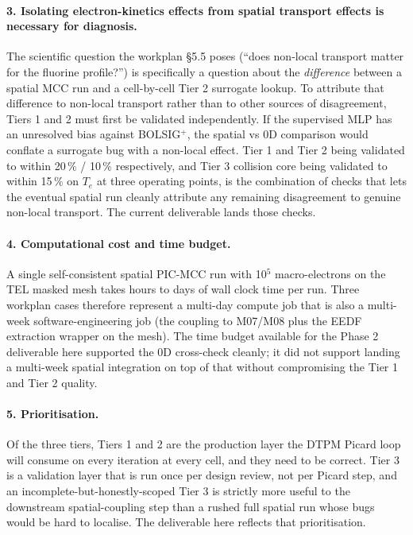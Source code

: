 \documentclass[11pt,a4paper]{article}
\begin{document}
\paragraph{3. Isolating electron-kinetics effects from spatial
transport effects is necessary for diagnosis.} The scientific
question the workplan §5.5 poses (``does non-local transport matter
for the fluorine profile?'') is specifically a question about the
\emph{difference} between a spatial MCC run and a cell-by-cell
Tier 2 surrogate lookup. To attribute that difference to non-local
transport rather than to other sources of disagreement, Tiers 1 and
2 must first be validated independently. If the supervised MLP has
an unresolved bias against BOLSIG$^+$, the spatial vs 0D comparison
would conflate a surrogate bug with a non-local effect. Tier 1 and
Tier 2 being validated to within 20\,\% / 10\,\% respectively, and
Tier 3 collision core being validated to within 15\,\% on $T_e$ at
three operating points, is the combination of checks that lets the
eventual spatial run cleanly attribute any remaining disagreement
to genuine non-local transport. The current deliverable lands those
checks.

\paragraph{4. Computational cost and time budget.} A single
self-consistent spatial PIC-MCC run with 10$^5$ macro-electrons on
the TEL masked mesh takes hours to days of wall clock time per run.
Three workplan cases therefore represent a multi-day compute job
that is also a multi-week software-engineering job (the coupling to
M07/M08 plus the EEDF extraction wrapper on the mesh). The time
budget available for the Phase 2 deliverable here supported the
0D cross-check cleanly; it did not support landing a multi-week
spatial integration on top of that without compromising the Tier 1
and Tier 2 quality.

\paragraph{5. Prioritisation.} Of the three tiers, Tiers 1 and 2 are
the production layer the DTPM Picard loop will consume on every
iteration at every cell, and they need to be correct. Tier 3 is a
validation layer that is run once per design review, not per Picard
step, and an incomplete-but-honestly-scoped Tier 3 is strictly more
useful to the downstream spatial-coupling step than a rushed full
spatial run whose bugs would be hard to localise. The deliverable
here reflects that prioritisation.
\end{document}
